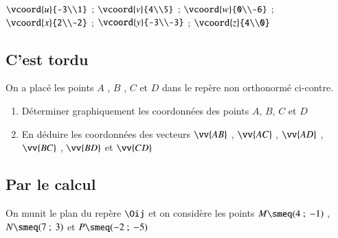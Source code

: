 \documentclass[oneside,12pt]{article}          %
\begin{document}
$\vcoord{u}{-3\\1}$ \quad ; \quad $\vcoord{v}{4\\5}$ \quad ; \quad $\vcoord{w}{0\\-6}$ \quad ; \quad $\vcoord{x}{2\\-2}$ \quad ; \quad $\vcoord{y}{-3\\-3}$ \quad ; \quad $\vcoord{z}{4\\0}$



\subsection{C'est tordu}
\begin{minipage}{0.5\linewidth}
\end{minipage}
\begin{minipage}{0.4\linewidth} \restoreskip
	On a placé les points $A$ , $B$ , $C$ et $D$ dans le repère non orthonormé ci-contre.
	\begin{enumerate}
		\item Déterminer graphiquement les coordonnées des points $A$, $B$, $C$ et $D$
		\item En déduire les coordonnées des vecteurs \vphantom{\huge I} $\vv{AB}$ , $\vv{AC}$ , $\vv{AD}$ , $\vv{BC}$ , $\vv{BD}$ et $\vv{CD}$\vphantom{\huge I}
	\end{enumerate}
\end{minipage}



\subsection{Par le calcul}
On munit le plan du repère $\Oij$ et on considère les points $M\smeq(4~;~-1)$ , $N\smeq(7~;~3)$ et $P\smeq(-2~;~-5)$
\end{document}
